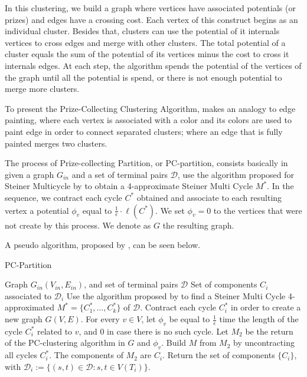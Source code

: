 In this clustering, we build a graph where vertices have associated potentials (or prizes) and edges have a crossing cost. Each vertex of this construct begins as an individual cluster. Besides that, clusters can use the potential of it internals vertices to cross edges and merge with other clusters. The total potential of a cluster equals the sum of the potential of its vertices minus the cost to cross it internals edges. At each step, the algorithm spends the potential of the vertices of the graph until all the potential is spend, or there is not enough potential to merge more clusters.

To present the Prize-Collecting Clustering Algorithm, \citeauthor{Bateni} makes an analogy to edge painting, where each vertex is associated with a color and its colors are used to paint edge in order to connect separated clusters; where an edge that is fully painted merges two clusters.

The process of Prize-collecting Partition, or PC-partition, consists basically in given a graph \(G_{in}\) and a set of terminal pairs \(\mathcal{D}\), use the algorithm proposed for Steiner Multicycle by \cite{Pereira2018TheSM} to obtain a 4-approximate Steiner Multi Cycle \(M^\ast\). In the sequence, we contract each cycle \(C^\ast\) obtained and associate to each resulting vertex a potential \(\phi_v\) equal to \(\frac{1}{\epsilon} \cdot \ell(C^\ast)\). We set \(\phi_v = 0\) to the vertices that were not create by this process. We denote as \(G\) the resulting graph.

A pseudo algorithm, proposed by \citeauthor{Bateni}, can be seen below.

\begin{algorithm}[H]
\caption{PC-Partition}
\begin{algorithmic}[1]

\Require Graph \(G_{in}(V_{in} , E_{in})\), and set of terminal pairs \(\mathcal{D}\)
\Ensure Set of components \(C_i\) associated to \(\mathcal{D}_i\)
\State Use the algorithm proposed by \cite{Pereira2018TheSM} to find a Steiner Multi Cycle 4-approximated \(M^\ast = \{C^\ast_1, \dots, C^\ast_k\}\) of \(\mathcal{D}\).
\State Contract each cycle \(C_i^\ast\) in order to create a new graph \(G(V, E)\).
\State For every \(v \in V\), let \(\phi_v\) be equal to \(\frac{1}{\epsilon}\) time the length of the cycle \(C_i^\ast\) related to \(v\), and \(0\) in case there is no such cycle.
\State Let \(M_2\) be the return of the PC-clustering algorithm in \(G\) and \(\phi_v\).
\State Build \(M\) from \(M_2\) by uncontracting all cycles \(C_i^\ast\). The components of \(M_2\) are \(C_i\).
\State Return the set of components \(\{C_i\}\), with \(\mathcal{D}_i := \{(s, t) \in \mathcal{D}: s, t \in V(T_i)\}\).

\end{algorithmic}
\end{algorithm}

